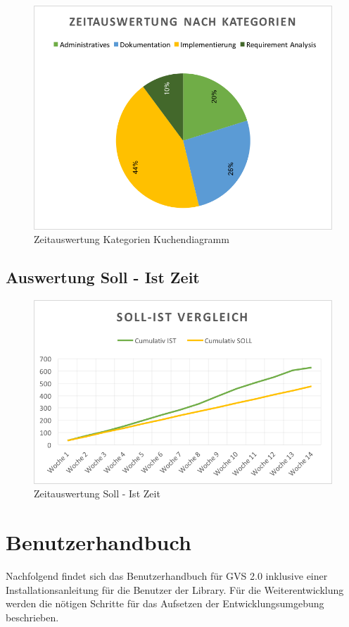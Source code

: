 \documentclass[11pt,a4paper,english,oneside]{book}
\numberwithin{equation}{chapter}
\begin{document}
	\clearpage

	\begin{figure}[h!]
		\centering
		\includegraphics[width=0.7\linewidth]{assets/images/zeitauswertung-kat-pie}
		\caption{Zeitauswertung Kategorien Kuchendiagramm}
		\label{zeitauswertung-kategorien-pie}
	\end{figure}


	\section{Auswertung Soll - Ist Zeit}
	\begin{figure}[h!]
		\centering
		\includegraphics[width=0.7\linewidth]{assets/images/zeitauswertung-soll_ist}
		\caption{Zeitauswertung Soll - Ist Zeit}
		\label{zeitauswertung-soll_ist}
	\end{figure}
	
	\chapter{Benutzerhandbuch} \label{ch:manual}
	Nachfolgend findet sich das Benutzerhandbuch für GVS 2.0 inklusive einer Installationsanleitung für die Benutzer der Library. Für die Weiterentwicklung werden die nötigen Schritte für das Aufsetzen der Entwicklungsumgebung beschrieben.
	
\end{document}

